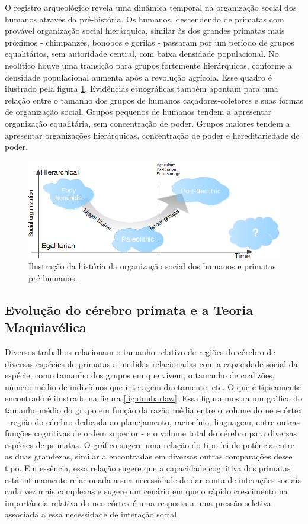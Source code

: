 O registro arqueológico revela uma dinâmica temporal na organização social dos humanos através da pré-história. Os humanos, descendendo de primatas com provável organização social hierárquica, similar às dos grandes primatas mais próximos - chimpanzés, bonobos e gorilas - passaram por um período de grupos equalitários, sem autoridade central, com baixa densidade populacional. No neolítico houve uma transição para grupos fortemente hierárquicos, conforme a densidade populacional aumenta após a revolução agrícola. Esse quadro é ilustrado pela figura \ref{fig:ushaped}. Evidências etnográficas também apontam para uma relação entre o tamanho dos grupos de humanos caçadores-coletores e suas formas de organização social\cite{Currie2010}. Grupos pequenos de humanos tendem a apresentar organização equalitária, sem concentração de poder. Grupos maiores tendem a apresentar organizações hierárquicas, concentração de poder e hereditariedade de poder. 
\begin{figure}
	\centering
	\includegraphics[width = 1.1\textwidth]{figuras/ushaped.png}
	\caption{ Ilustração da história da organização social dos humanos e primatas pré-humanos.}
	\label{fig:ushaped}
\end{figure}


\subsection{Evolução do cérebro primata e a Teoria Maquiavélica}

Diversos trabalhos\cite[-1cm]{Dunbar2008,Dunbar2009, Dunbar2010,Aiello1993,Joffe1997} relacionam o tamanho relativo de regiões do cérebro de diversas espécies de primatas a medidas relacionadas com a capacidade social da espécie, como tamanho dos grupos em que vivem, o tamanho de coalizões, número médio de indivíduos que interagem diretamente, etc. O que é típicamente encontrado é ilustrado na figura \ref{fig:dunbarlaw}. Essa figura mostra um gráfico do tamanho médio do grupo em função da razão média entre o volume do neo-córtex - região do cérebro dedicada ao planejamento, raciocínio, linguagem, entre outras funções cognitivas de ordem superior - e o volume total do cérebro para diversas espécies de primatas. O gráfico sugere uma relação do tipo lei de potência entre as duas grandezas, similar a encontradas em diversas outras comparações desse tipo. Em essência, essa relação sugere que a capacidade cognitiva dos primatas está intimamente relacionada a sua necessidade de dar conta de interações sociais cada 
vez mais complexas e sugere um cenário em que o rápido crescimento na importância relativa do neo-córtex é uma resposta a uma pressão seletiva associada a essa necessidade de interação social.  

